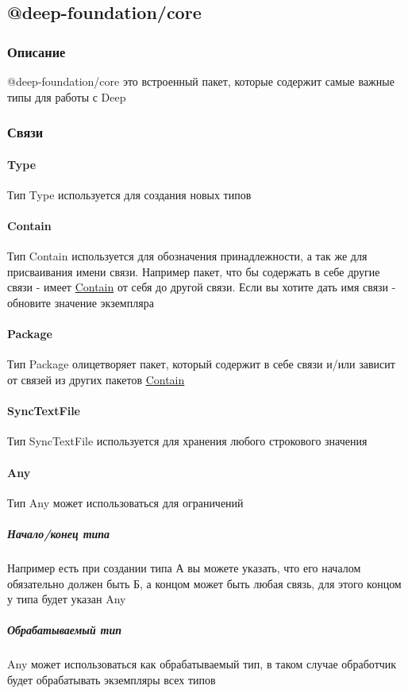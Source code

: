 \subsection{@deep-foundation/core}
\subsubsection{Описание}\hypertarget{Core.Description}{}
@deep-foundation/core это встроенный пакет, которые
содержит самые важные типы для работы с Deep
\subsubsection{Связи}
\paragraph*{Type}\hypertarget{Core.Type.Description}{}
Тип Type используется для создания новых типов
\paragraph*{Contain}\hypertarget{Core.Contain.Description}{}
Тип Contain используется для обозначения
принадлежности, а так же для присваивания имени связи. Например пакет, что бы
содержать в себе другие связи - имеет
\hyperlink{Core.Contain.Description}{Contain} от себя
до другой связи. Если вы хотите дать имя связи - обновите значение экземпляра
\paragraph*{Package}\hypertarget{Core.Package.Description}{}
Тип Package олицетворяет пакет, который содержит в себе связи и/или зависит от
связей из других пакетов
\hyperlink{Core.Contain.Description}{Contain}
\paragraph*{SyncTextFile}\hypertarget{Core.SyncTextFile.Description}{}
Тип SyncTextFile используется для хранения
любого строкового значения
\paragraph*{Any}\hypertarget{Core.Any.Description}{}
Тип Any может использоваться для ограничений
\subparagraph*{Начало/конец типа}
Например есть при создании типа А вы можете указать, что его началом
обязательно должен быть Б, а концом может быть любая связь, для этого концом у
типа будет указан Any
\subparagraph*{Обрабатываемый тип}
Any может использоваться как обрабатываемый тип, в таком случае обработчик
будет обрабатывать экземпляры всех типов
